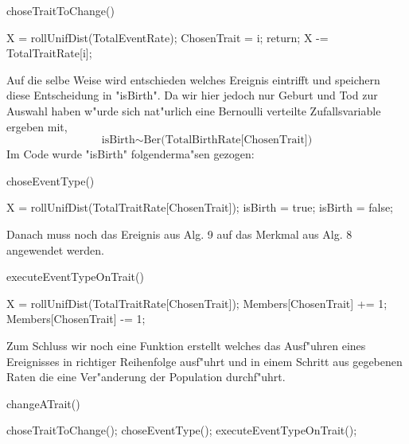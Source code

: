 \documentclass[11pt, a4paper, german]{article}
\theoremstyle{plain}
\begin{document}
	\begin{algorithm}[H]
 		\caption{choseTraitToChange()}
 		\begin{algorithmic}[1]
 			\State X = rollUnifDist(TotalEventRate);
 					\State ChosenTrait = i;
 					\State return;
 				\EndIf
 				\State X -= TotalTraitRate[i];
 			\EndFor
 		\end{algorithmic}
 	\end{algorithm}
 	Auf die selbe Weise wird entschieden welches Ereignis eintrifft und speichern diese Entscheidung in "{}isBirth"{}. Da wir hier jedoch nur Geburt und Tod zur Auswahl haben w"urde sich nat"urlich eine Bernoulli verteilte Zufallsvariable ergeben mit, 
 	\[ \text{isBirth} \sim \text{Ber(TotalBirthRate[ChosenTrait])} \]
 	Im Code wurde "{}isBirth"{} folgenderma"sen gezogen:
	\begin{algorithm}[H]
 		\caption{choseEventType()}
 		\begin{algorithmic}[1]
 			\State X = rollUnifDist(TotalTraitRate[ChosenTrait]);
 				\State isBirth = true;
 			\Else
 				\State isBirth = false;
 			\EndIf
 		\end{algorithmic}
 	\end{algorithm}
 	Danach muss noch das Ereignis aus Alg. 9 auf das Merkmal aus Alg. 8 angewendet werden.
	\begin{algorithm}[H]
 		\caption{executeEventTypeOnTrait()}
 		\begin{algorithmic}[1]
 			\State X = rollUnifDist(TotalTraitRate[ChosenTrait]);
 				\State Members[ChosenTrait] += 1;
 			\EndIf
 				\State Members[ChosenTrait] -= 1;
 			\EndIf
 		\end{algorithmic}
 	\end{algorithm} 	
 	Zum Schluss wir noch eine Funktion erstellt welches das Ausf"uhren eines Ereignisses in richtiger Reihenfolge ausf"uhrt und in einem Schritt aus gegebenen Raten die eine Ver"anderung der Population durchf"uhrt.
 	\begin{algorithm}[H]
 		\caption{changeATrait()}
 		\begin{algorithmic}[1]
 			\State choseTraitToChange();
 			\State choseEventType();
 			\State executeEventTypeOnTrait();
 		\end{algorithmic}
 	\end{algorithm} 
\end{document}
